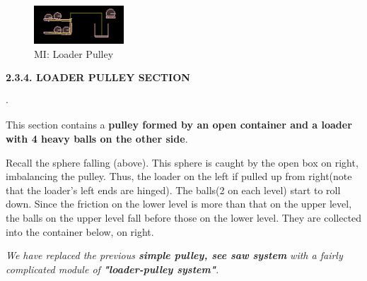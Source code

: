 \documentclass{report}
\begin{document}
\begin{figure}
\begin{center}
\includegraphics[width=0.3\textwidth, height=0.2\textwidth]{latex/box2d_4.png}
\end{center}
\caption{MI: Loader Pulley}
\end{figure}
\textbf{2.3.4. LOADER PULLEY SECTION}
\begin{list}{$\cdot$}{\setlength{\leftmargin}{0em}}
\item This section contains a \textbf{pulley\cite{pulley} formed by an open container and a loader\cite{revolute_joint} with 4 heavy balls on the other side}.
\item Recall the sphere falling (above). This sphere is caught by the open box on right, imbalancing the pulley. Thus, the loader on the left if pulled up from right(note that the loader's left ends are hinged). The balls(2 on each level) start to roll down. Since the friction on the lower level is more than that on the upper level, the balls on the upper level fall before those on the lower level. They are collected into the container below, on right. 
\item \emph{We have replaced the previous \textbf{simple pulley, see saw system} with a fairly complicated module of \textbf{"loader-pulley system"}.}\\
\end{list}
\end{document}
